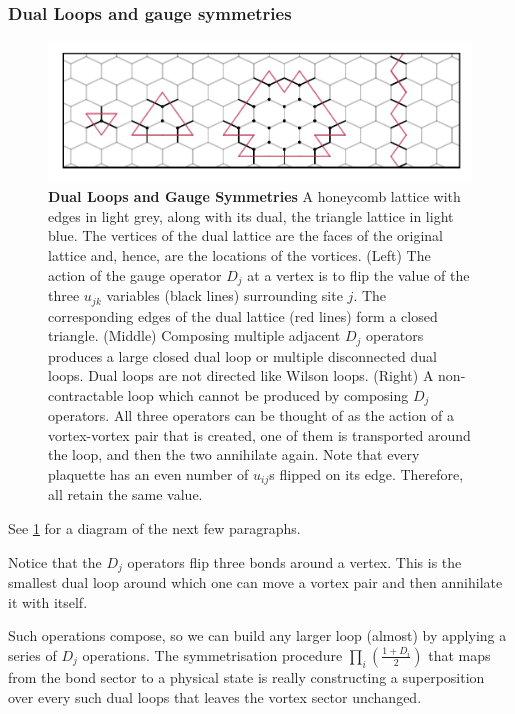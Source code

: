 \hypertarget{dual-loops-and-gauge-symmetries}{%
\subsubsection{Dual Loops and gauge symmetries}\label{dual-loops-and-gauge-symmetries}}

\begin{figure}
\hypertarget{fig:gauge_symmetries}{%
\centering
\includegraphics[width=1\textwidth,height=\textheight]{figure_code/amk_chapter/intro/gauge_symmetries/gauge_symmetries.pdf}
\caption{\textbf{Dual Loops and Gauge Symmetries} A honeycomb lattice with edges in light grey, along with its dual, the triangle lattice in light blue. The vertices of the dual lattice are the faces of the original lattice and, hence, are the locations of the vortices. (Left) The action of the gauge operator \(D_j\) at a vertex is to flip the value of the three \(u_{jk}\) variables (black lines) surrounding site \(j\). The corresponding edges of the dual lattice (red lines) form a closed triangle. (Middle) Composing multiple adjacent \(D_j\) operators produces a large closed dual loop or multiple disconnected dual loops. Dual loops are not directed like Wilson loops. (Right) A non-contractable loop which cannot be produced by composing \(D_j\) operators. All three operators can be thought of as the action of a vortex-vortex pair that is created, one of them is transported around the loop, and then the two annihilate again. Note that every plaquette has an even number of \(u_{ij}\)s flipped on its edge. Therefore, all retain the same value.}\label{fig:gauge_symmetries}
}
\end{figure}

See \cref{fig:gauge_symmetries} for a diagram of the next few paragraphs.

Notice that the \(D_j\) operators flip three bonds around a vertex. This is the smallest dual loop around which one can move a vortex pair and then annihilate it with itself.

Such operations compose, so we can build any larger loop (almost) by applying a series of \(D_j\) operations. The symmetrisation procedure \(\prod_i \left( \frac{1 + D_i}{2}\right)\) that maps from the bond sector to a physical state is really constructing a superposition over every such dual loops that leaves the vortex sector unchanged.

